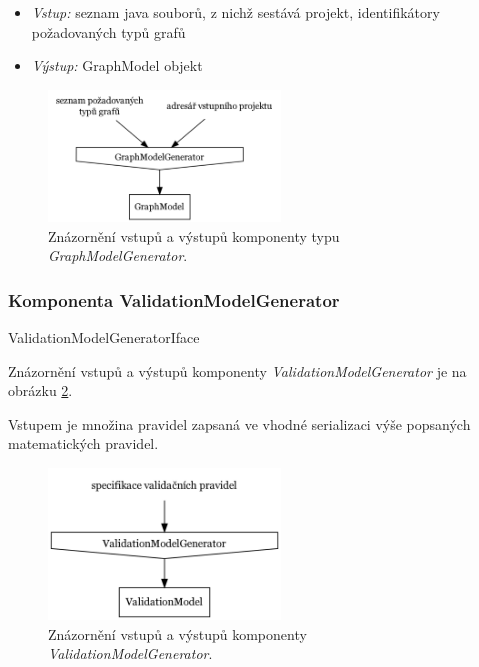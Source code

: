 \begin{itemize}
\item \emph{Vstup:} seznam java souborů, z nichž sestává projekt, identifikátory požadovaných typů grafů
\item \emph{Výstup:} GraphModel objekt
\end{itemize}

\begin{figure}[h!]
  \centering
  \includegraphics[width=0.55\textwidth]{./graphs/graph_generator_io_graph.png}
  \caption{Znázornění vstupů a výstupů komponenty typu \emph{GraphModelGenerator}.\label{design-graph_generator_io}}
\end{figure}

\subsubsection{Komponenta ValidationModelGenerator}
ValidationModelGeneratorIface

Znázornění vstupů a výstupů komponenty \emph{ValidationModelGenerator} je na obrázku \ref{design-validation_model_generator_io}.

Vstupem je množina pravidel zapsaná ve vhodné serializaci výše popsaných matematických pravidel.

\begin{figure}[h!]
  \centering
  \includegraphics[width=0.55\textwidth]{./graphs/validation_model_generator_io_graph.png}
  \caption{Znázornění vstupů a výstupů komponenty \emph{ValidationModelGenerator}.\label{design-validation_model_generator_io}}
\end{figure}


